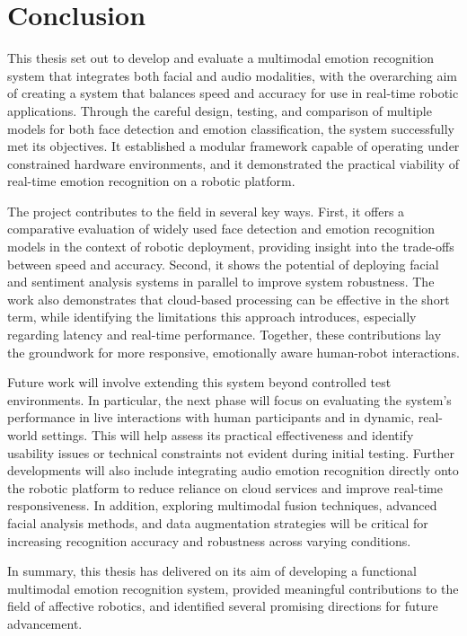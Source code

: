 \chapter{Conclusion}
This thesis set out to develop and evaluate a multimodal emotion recognition system that integrates both facial and audio modalities, with the overarching aim of creating a system that balances speed and accuracy for use in real-time robotic applications. Through the careful design, testing, and comparison of multiple models for both face detection and emotion classification, the system successfully met its objectives. It established a modular framework capable of operating under constrained hardware environments, and it demonstrated the practical viability of real-time emotion recognition on a robotic platform.

The project contributes to the field in several key ways. First, it offers a comparative evaluation of widely used face detection and emotion recognition models in the context of robotic deployment, providing insight into the trade-offs between speed and accuracy. Second, it shows the potential of deploying facial and sentiment analysis systems in parallel to improve system robustness. The work also demonstrates that cloud-based processing can be effective in the short term, while identifying the limitations this approach introduces, especially regarding latency and real-time performance. Together, these contributions lay the groundwork for more responsive, emotionally aware human-robot interactions.

Future work will involve extending this system beyond controlled test environments. In particular, the next phase will focus on evaluating the system's performance in live interactions with human participants and in dynamic, real-world settings. This will help assess its practical effectiveness and identify usability issues or technical constraints not evident during initial testing. Further developments will also include integrating audio emotion recognition directly onto the robotic platform to reduce reliance on cloud services and improve real-time responsiveness. In addition, exploring multimodal fusion techniques, advanced facial analysis methods, and data augmentation strategies will be critical for increasing recognition accuracy and robustness across varying conditions.

In summary, this thesis has delivered on its aim of developing a functional multimodal emotion recognition system, provided meaningful contributions to the field of affective robotics, and identified several promising directions for future advancement.
